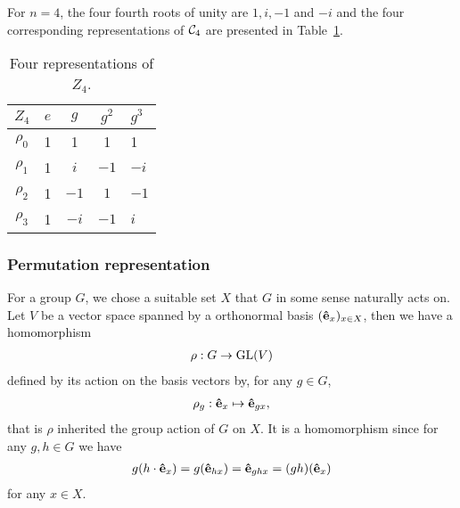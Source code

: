 \begin{example}
	For $n = 4$, the four fourth roots of unity are $1,i,-1$ and $-i$ and the four corresponding representations of $\mathcal{C}_4$ are presented in Table~\ref{table:C4}.
	\begin{table}[hbt!]\label{table:C4}
		\begin{tabular}{c | c c cl}
			$Z_4$ & $e$ & $g$  & $g^2$ & $g^3$ \\ \hline
			$\rho_0$           & 1   & 1    & 1     & 1     \\
			$\rho_1$           & 1   & $i$  & $-1$  & $-i$  \\
			$\rho_2$           & 1   & $-1$ & $1$  & $-1$   \\
			$\rho_3$           & 1   & $-i$ & $-1$   & $i$
		\end{tabular}
		\centering
		\caption{Four representations of $Z_4$.}
	\end{table}
\end{example}

\subsubsection{Permutation representation}

	For a group $G$, we chose a suitable set $X$ that $G$ in some sense naturally acts on. Let $V$ be a vector space spanned by a orthonormal basis $(\mathbf{\hat{e}}_x)_{x \in X}$, then we have a homomorphism
	\begin{align*}
		\rho:G \rightarrow \text{GL}(V)
	\end{align*} 
	defined by its action on the basis vectors by, for any $g \in G$, 
	\begin{align*}
		\rho_g: \mathbf{\hat{e}}_x \mapsto \mathbf{\hat{e}}_{gx},
	\end{align*}
	that is $\rho$ inherited the group action of $G$ on $X$. It is a homomorphism since for any $g,h \in G$ we have
	\begin{align*}
		g(h \cdot \mathbf{\hat{e}}_x) = g(\mathbf{\hat{e}}_{hx}) = \mathbf{\hat{e}}_{ghx} = (gh)(\mathbf{\hat{e}}_x)
	\end{align*}
	for any $x \in X$.
	
